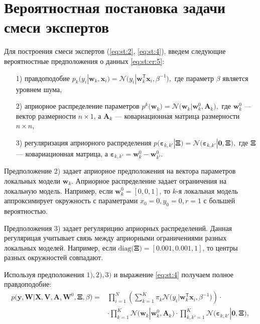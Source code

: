 \section{Вероятностная постановка задачи смеси экспертов}
Для построения смеси экспертов (\ref{eq:st:2},  \ref{eq:st:4}), введем следующие вероятностные предположения о данных \eqref{eq:st:cr:5}:

\begin{enumerate}
	\item[1)] правдоподобие $p_{k}\bigr(y_{i}|\mathbf{w}_{k}, \mathbf{x}_{i}\bigr) = \mathcal{N}\bigr(y_{i}|\mathbf{w}_{k}^{\mathsf{T}}\mathbf{x}_{i}, \beta^{-1}\bigr),$ где параметр $\beta$ является уровнем шума,
	\item[2)] априорное распределение параметров $p^{k}\bigr(\mathbf{w}_{k}\bigr) = \mathcal{N}\bigr(\mathbf{w}_{k}|\mathbf{w}^{0}_{k}, \mathbf{A}_{k}\bigr),$ где $\mathbf{w}^{0}_{k}$ --- вектор размерности $n\times1$, а  $\mathbf{A}_{k}$ --- ковариационная матрица размерности $n\times n$,
	\item[3)] регуляризация априорного распределения $p\bigr(\bm{\varepsilon}_{k,k'}|\bm{\Xi}\bigr) = \mathcal{N}\bigr(\bm{\varepsilon}_{k,k'}|\mathbf{0},  \bm{\Xi}\bigr),$ где $\bm{\Xi}$ --- ковариационная матрица, а $\bm{\varepsilon}_{k,k'} = \mathbf{w}_{k}^{0}-\mathbf{w}_{k'}^{0}.$
\end{enumerate}
Предположение 2) задает априорное предположения на вектора параметров локальных модели $\textbf{w}_k$. Априорное распределение  задает ограничения на локальную модель. Например, если $\textbf{w}_k^{0} = [0,0,1]$, то $k$-я локальная модель аппроксимирует окружность с параметрами $x_0=0, y_0=0, r=1$ с большей вероятностью.

Предположения 3) задает регулярицию априорных распределений. Данная регулярицая учитывает связь между априорными ограничениями разных локальных моделей. Например, если $\text{diag}\bigr(\bm{\Xi}\bigr)=[0.001, 0.001, 1]$, то  центры разных окружностей совпадают.

Используя предположения $1), 2), 3)$ и выражение \eqref{eq:st:4} получаем полное правдоподобие:
\[
\label{eq:em:1}
\begin{aligned}
p\bigr(\mathbf{y}, \mathbf{W}|\mathbf{X}, \mathbf{V}, \textbf{A}, \textbf{W}^{0}, \bm{\Xi}, \beta\bigr) = &\prod_{i=1}^{N}\left(\sum_{k=1}^{K}\pi_{k}\mathcal{N}\bigr(y_{i}|\mathbf{w}_{k}^{\mathsf{T}}\mathbf{x}_{i}, \beta^{-1}\bigr)\right)\cdot\\
&\cdot\prod_{k=1}^{K}\mathcal{N}\bigr(\mathbf{w}_{k}|\mathbf{w}^{0}_{k}, \mathbf{A}_{k}\bigr)\cdot\prod_{k,k'=1}^{K}\mathcal{N}\bigr(\bm{\varepsilon}_{k,k'}|\mathbf{0},  \bm{\Xi}\bigr),
\end{aligned}
\]

